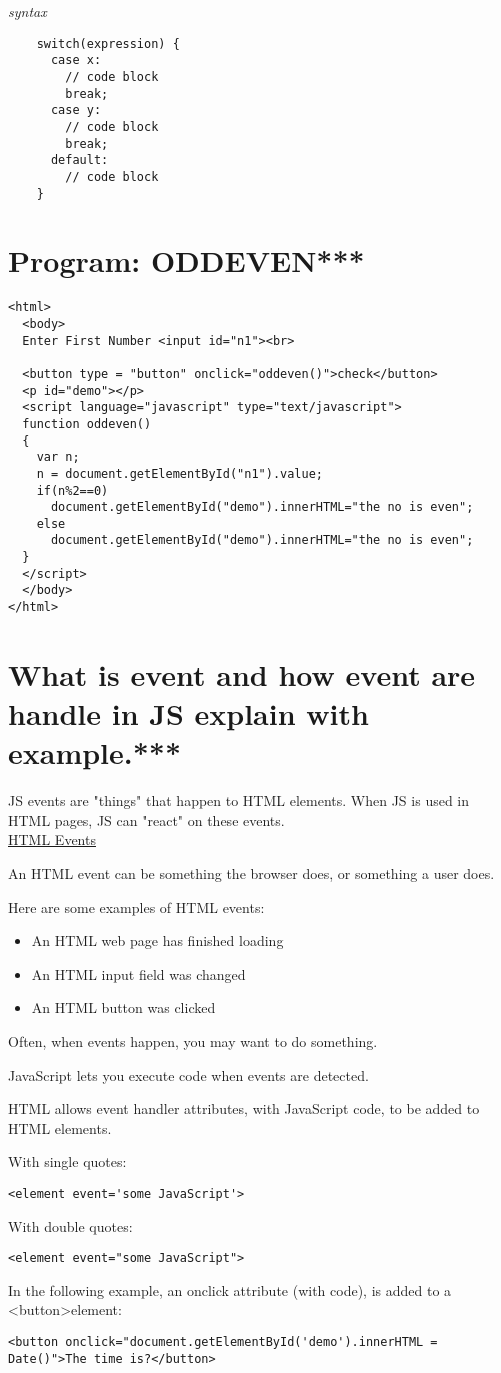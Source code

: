 \documentclass[14pt]{article}
\begin{document}
{\begin{itemize}
    \textit{syntax}
    \begin{lstlisting}
    switch(expression) {
      case x:
        // code block
        break;
      case y:
        // code block
        break;
      default:
        // code block
    }
    \end{lstlisting}
\end{itemize}

\section{Program: ODDEVEN***}
\begin{lstlisting}
<html>
  <body>
  Enter First Number <input id="n1"><br>

  <button type = "button" onclick="oddeven()">check</button>
  <p id="demo"></p>
  <script language="javascript" type="text/javascript">
  function oddeven()
  {
    var n;
    n = document.getElementById("n1").value;
    if(n%2==0)
      document.getElementById("demo").innerHTML="the no is even";
    else
      document.getElementById("demo").innerHTML="the no is even";
  }
  </script>
  </body>
</html>
\end{lstlisting}
\section{What is event and how event are handle in JS explain with example.***}
JS events are "things" that happen to HTML elements. When JS is used in HTML pages, JS can "react" on these events.
\ \\

\large \underline{HTML Events}\normalsize

An HTML event can be something the browser does, or something a user does.

Here are some examples of HTML events:
\begin{itemize}
  \item An HTML web page has finished loading
  \item An HTML input field was changed
  \item An HTML button was clicked
\end{itemize}
Often, when events happen, you may want to do something.

JavaScript lets you execute code when events are detected.

HTML allows event handler attributes, with JavaScript code, to be added to HTML elements.

With single quotes:
\begin{lstlisting}
<element event='some JavaScript'>
\end{lstlisting}
With double quotes:
\begin{lstlisting}
<element event="some JavaScript">
\end{lstlisting}
In the following example, an onclick attribute (with code), is added to a \textless button\textgreater element:
\begin{lstlisting}
<button onclick="document.getElementById('demo').innerHTML = Date()">The time is?</button>
\end{lstlisting}
\ \\

}
\end{document}
